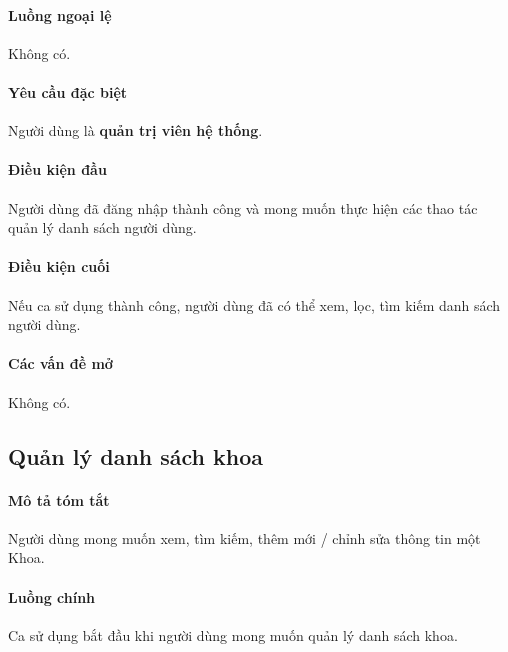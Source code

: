\documentclass[./../main.tex]{subfiles}
\begin{document}
\paragraph*{Luồng ngoại lệ} Không có.

\paragraph*{Yêu cầu đặc biệt}

Người dùng là \textbf{quản trị viên hệ thống}.

\paragraph*{Điều kiện đầu}

Người dùng đã đăng nhập thành công và mong muốn thực hiện các thao tác quản lý danh sách người dùng.

\paragraph*{Điều kiện cuối}

Nếu ca sử dụng thành công, người dùng đã có thể xem, lọc, tìm kiếm danh sách người dùng.

\paragraph*{Các vấn đề mở}

Không có.

\subsection{Quản lý danh sách khoa}

\paragraph*{Mô tả tóm tắt}

Người dùng mong muốn xem, tìm kiếm, thêm mới / chỉnh sửa thông tin một Khoa.

\paragraph*{Luồng chính} Ca sử dụng bắt đầu khi người dùng mong muốn quản lý danh sách khoa.
\end{document}
